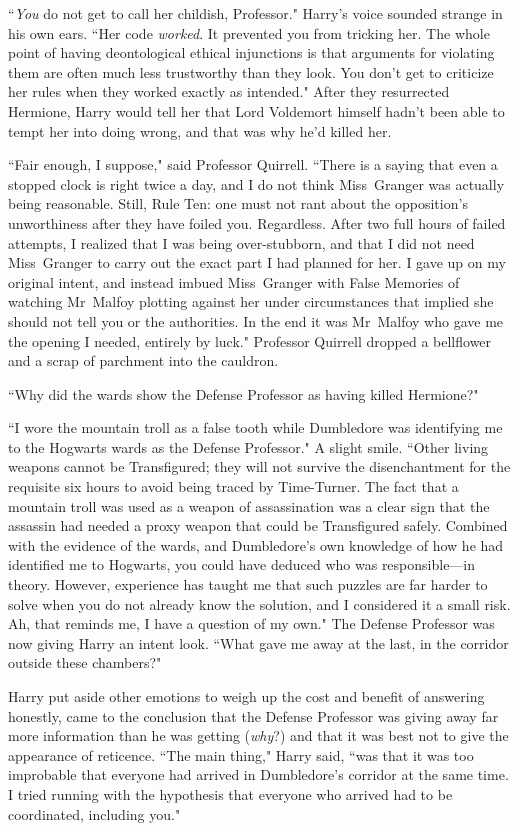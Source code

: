 ``\emph{You} do not get to call her childish, Professor." Harry's voice sounded strange in his own ears. ``Her code \emph{worked}. It prevented you from tricking her. The whole point of having deontological ethical injunctions is that arguments for violating them are often much less trustworthy than they look. You don't get to criticize her rules when they worked exactly as intended." After they resurrected Hermione, Harry would tell her that Lord Voldemort himself hadn't been able to tempt her into doing wrong, and that was why he'd killed her.

``Fair enough, I suppose," said Professor Quirrell. ``There is a saying that even a stopped clock is right twice a day, and I do not think Miss~Granger was actually being reasonable. Still, Rule Ten: one must not rant about the opposition's unworthiness after they have foiled you. Regardless. After two full hours of failed attempts, I realized that I was being over-stubborn, and that I did not need Miss~Granger to carry out the exact part I had planned for her. I gave up on my original intent, and instead imbued Miss~Granger with False Memories of watching Mr~Malfoy plotting against her under circumstances that implied she should not tell you or the authorities. In the end it was Mr~Malfoy who gave me the opening I needed, entirely by luck." Professor Quirrell dropped a bellflower and a scrap of parchment into the cauldron.

``Why did the wards show the Defense Professor as having killed Hermione?"

``I wore the mountain troll as a false tooth while Dumbledore was identifying me to the Hogwarts wards as the Defense Professor." A slight smile. ``Other living weapons cannot be Transfigured; they will not survive the disenchantment for the requisite six hours to avoid being traced by Time-Turner. The fact that a mountain troll was used as a weapon of assassination was a clear sign that the assassin had needed a proxy weapon that could be Transfigured safely. Combined with the evidence of the wards, and Dumbledore's own knowledge of how he had identified me to Hogwarts, you could have deduced who was responsible—in theory. However, experience has taught me that such puzzles are far harder to solve when you do not already know the solution, and I considered it a small risk. Ah, that reminds me, I have a question of my own." The Defense Professor was now giving Harry an intent look. ``What gave me away at the last, in the corridor outside these chambers?"

Harry put aside other emotions to weigh up the cost and benefit of answering honestly, came to the conclusion that the Defense Professor was giving away far more information than he was getting (\emph{why}?) and that it was best not to give the appearance of reticence. ``The main thing," Harry said, ``was that it was too improbable that everyone had arrived in Dumbledore's corridor at the same time. I tried running with the hypothesis that everyone who arrived had to be coordinated, including you."

